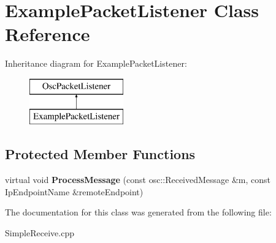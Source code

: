 \hypertarget{classExamplePacketListener}{}\section{Example\+Packet\+Listener Class Reference}
\label{classExamplePacketListener}
Inheritance diagram for Example\+Packet\+Listener\+:\begin{figure}[H]
\begin{center}
\leavevmode
\includegraphics[height=2.000000cm]{classExamplePacketListener}
\end{center}
\end{figure}
\subsection*{Protected Member Functions}
\begin{DoxyCompactItemize}
\item 
virtual void {\bfseries Process\+Message} (const osc\+::\+Received\+Message \&m, const Ip\+Endpoint\+Name \&remote\+Endpoint)\hypertarget{classExamplePacketListener_a688ed2a3ec01d0fb7661f4fe0ffc90df}{}\label{classExamplePacketListener_a688ed2a3ec01d0fb7661f4fe0ffc90df}

\end{DoxyCompactItemize}


The documentation for this class was generated from the following file\+:\begin{DoxyCompactItemize}
\item 
Simple\+Receive.\+cpp\end{DoxyCompactItemize}
